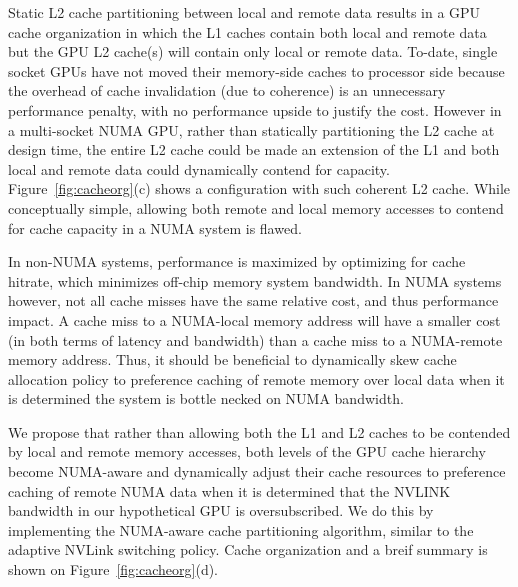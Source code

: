 Static L2 cache partitioning between local and remote data results in a GPU cache
organization in which the L1 caches contain both local and remote data but the GPU
L2 cache(s) will contain only local or remote data.  To-date, single socket GPUs
have not moved their memory-side caches to processor side because the overhead of
cache invalidation (due to coherence) is an unnecessary performance penalty, with
no performance upside to justify the cost.  However in a multi-socket NUMA GPU,
rather than statically partitioning the L2 cache at design time, the entire L2 cache
could be made an extension of the L1 and both local and remote data could dynamically
contend for capacity. Figure~\ref{fig:cacheorg}(c) shows a configuration with such coherent L2 cache. While conceptually simple, allowing both remote and local
memory accesses to contend for cache capacity in a NUMA system is flawed.

In non-NUMA systems, performance is maximized by optimizing for cache hitrate, which
minimizes off-chip memory system bandwidth.  In NUMA systems however, not all cache
misses have the same relative cost, and thus performance impact.  A cache miss to a 
NUMA-local memory address will have a smaller cost (in both terms of latency and bandwidth)
than a cache miss to a NUMA-remote memory address.  Thus, it should be beneficial
to dynamically skew cache allocation policy to preference caching of remote memory over local
data when it is determined the system is bottle necked on NUMA bandwidth.

We propose that rather than allowing both the L1 and L2 caches to be contended by local
and remote memory accesses,  both levels of the GPU cache hierarchy become NUMA-aware
and dynamically adjust their cache resources to preference caching of remote NUMA
data when it is determined that the NVLINK bandwidth in our hypothetical GPU is
oversubscribed.  We do this by implementing the NUMA-aware cache partitioning
algorithm, similar to the adaptive NVLink switching policy. Cache organization and a breif summary is shown on Figure~\ref{fig:cacheorg}(d).


